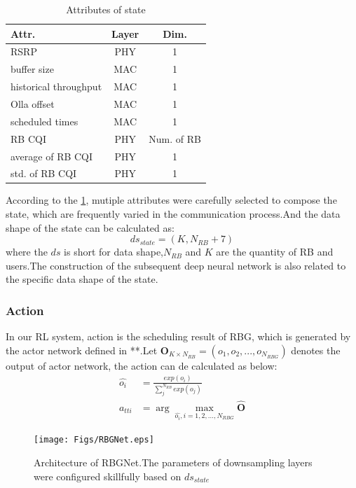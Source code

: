 \documentclass[conference,compsocconf]{IEEEtran}
\begin{document}
\begin{table}[H]
	\caption{Attributes of state}\label{tb:1}
	\centering
	\begin{tabular}{lcc}
		\hline
		Attr.                    & Layer   & Dim.       \\ \hline
		RSRP                    & PHY & 1         \\
		buffer size             & MAC & 1         \\
		historical throughput   & MAC & 1         \\
		Olla offset             & MAC & 1         \\
		scheduled times         & MAC & 1         \\
		RB CQI                  & PHY & Num. of RB \\
		average of RB CQI       & PHY & 1         \\
		std. of RB CQI          & PHY & 1         \\ \hline
	\end{tabular}
\end{table}
According to the \ref{tb:1}, mutiple attributes were carefully selected to compose the state, which are frequently varied in the communication process.And the data shape of the state can be calculated as:
\begin{equation}
    ds_{state}=(K, N_{RB} + 7)
\end{equation}
where the $ds$ is short for data shape,$N_{RB}$ and $K$ are the quantity of RB and users.The construction of the subsequent deep neural network is also related to the specific data shape of the state.

\subsubsection{Action}
In our RL system, action is the scheduling result of RBG, which is generated by the actor network defined in **.Let $ \textbf{O}_{K \times N_{RB}}=(o_{1},o_{2},...,o_{N_{RBG}})$ denotes the output of actor network, the action can de calculated as below:
\begin{equation}
	\begin{aligned}
		\hat{o_{i}} &= \frac{exp(o_{i})}{\sum_{j}^{N_{RB}}exp(o_{j})} \\
		a_{tti} &= \arg\mathop{\max} \limits_{\hat{o_{i}}, i=1,2,...,N_{RBG}} \hat{\textbf{O}}
	\end{aligned}
\end{equation}

\begin{figure}[htp]
	\centering
	\texttt{[image: Figs/RBGNet.eps]}
	\caption{Architecture of RBGNet.The parameters of downsampling layers were configured skillfully based on $ ds_{state} $}\label{fig:arch}
\end{figure}
\end{document}
